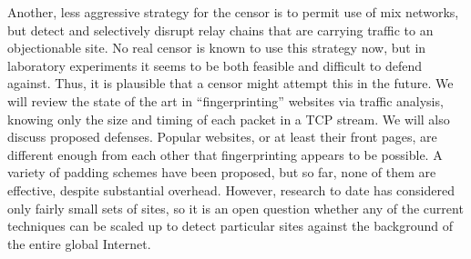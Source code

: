 \documentclass[onecolumn]{cmuecequal}
\begin{document}
Another, less aggressive strategy for the censor is to permit use of
mix networks, but detect and selectively disrupt relay chains that are
carrying traffic to an objectionable site.  No real censor is known to
use this strategy now, but in laboratory experiments it seems to be
both feasible and difficult to defend against.  Thus, it is plausible
that a censor might attempt this in the future.  We will review the
state of the art in “fingerprinting” websites via traffic analysis,
knowing only the size and timing of each packet in a TCP stream.  We
will also discuss proposed defenses.  Popular websites, or at least
their front pages, are different enough from each other that
fingerprinting appears to be possible.  A variety of padding schemes
have been proposed, but so far, none of them are effective, despite
substantial overhead.  However, research to date has considered only
fairly small sets of sites, so it is an open question whether any of
the current techniques can be scaled up to detect particular sites
against the background of the entire global Internet.
\end{document}
